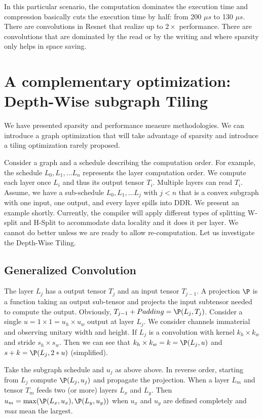 \documentclass[conference]{IEEEtran}
\begin{document}
In this particular scenario, the computation dominates the execution
time and compression basically cuts the execution time by half: from
200 $\mu s$ to 130 $\mu s$. There are convolutions in Resnet that
realize up to $2\times$ performance. There are convolutions that are
dominated by the read or by the writing and where sparsity only helps
in space saving.



\section{A complementary optimization: Depth-Wise subgraph Tiling}
We have presented sparsity and performance measure methodologies. We
can introduce a graph optimization that will take advantage of
sparsity and introduce a tiling optimization rarely proposed.

Consider a graph and a schedule describing the computation order. For
example, the schedule $L_0, L_1, \dots L_n$ represents the layer
computation order. We compute each layer once $L_i$ and thus its
output tensor $T_i$. Multiple layers can read $T_i$. Assume, we have a
sub-schedule $L_0, L_1, \dots L_j$ with $j<n$ that is a convex
subgraph with one input, one output, and every layer spills into
DDR. We present an example shortly. Currently, the compiler will apply
different types of splitting W-split and H-Split to accommodate data
locality and it does it per layer.  We cannot do better unless we are
ready to allow re-computation. Let us investigate the Depth-Wise
Tiling.

\subsection{Generalized Convolution} 
The layer $L_j$ has a output tensor $T_j$ and an input tensor
$T_{j-1}$. A projection $\P$ is a function taking an output sub-tensor
and projects the input subtensor needed to compute the
output. Obviously, $T_{j-1} + Padding = \P(L_j,T_j)$. Consider a
single $u = 1\times 1 = u_h \times u_w$ output at layer $L_j$. We
consider channels immaterial and observing unitary width and
height. If $L_j$ is a convolution with kernel $k_h\times k_w$ and
stride $s_h \times s_w$. Then we can see that $k_h\times k_w = k =
\P(L_j,u)$ and $s+k = \P(L_j,2*u)$ (simplified).

Take the subgraph schedule and $u_j$ as above above. In reverse order,
starting from $L_j$ compute $\P(L_j,u_j)$ and propagate the
projection. When a layer $L_m$ and tensor $T_m$ feeds two (or more)
layers $L_x$ and $L_y$. Then $u_m = \max ( \P(L_x,u_x),\P(L_y,u_y))$
when $u_x$ and $u_y$ are defined completely and {\em max} mean the
largest.
\end{document}
